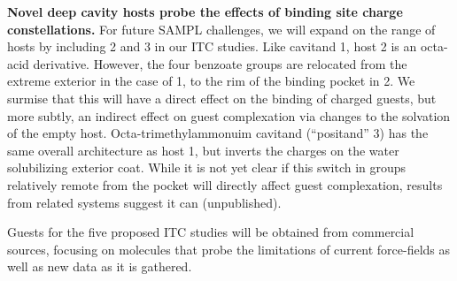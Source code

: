 \documentclass[11pt]{article}
\begin{document}
{\bf Novel deep cavity hosts probe the effects of binding site charge constellations.} 
For future SAMPL challenges, we will expand on the range of hosts by including 2 and 3 in our ITC studies.  
Like cavitand 1, host 2 is an octa-acid derivative.  However, the four benzoate groups are relocated from the extreme exterior in the case of 1, to the rim of the binding pocket in 2.  
We surmise that this will have a direct effect on the binding of charged guests, but more subtly, an indirect effect on guest complexation via changes to the solvation of the empty host.  
Octa-trimethylammonuim cavitand (``positand'' 3) has the same overall architecture as host 1, but inverts the charges on the water solubilizing exterior coat.  While it is not yet clear if this switch in groups relatively remote from the pocket will directly affect guest complexation, results from related systems suggest it can (unpublished).

Guests for the five proposed ITC studies will be obtained from commercial sources, focusing on molecules that probe the limitations of current force-fields as well as new data as it is gathered.   
\end{document}
